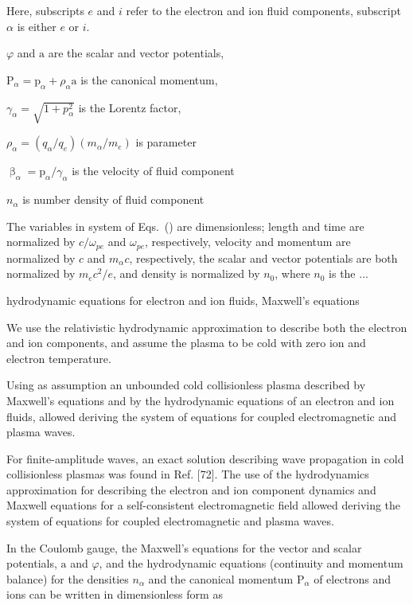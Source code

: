 \documentclass[10pt, a4paper, twoside, openright]{report}
\renewcommand{\vec}[1]{\boldsymbol{\mathrm{#1}}}
\begin{document}
Here, subscripts $ e $ and $ i $ refer to the electron and ion fluid components, subscript $ \alpha $ is either $ e $ or $ i $.

$ \varphi $ and $ \vec{a} $ are the scalar and vector potentials, 

$ \vec{P}_{\alpha} = \vec{p}_{\alpha} + \rho_{\alpha} \vec{a} $ is the canonical momentum, 

$ \gamma_{\alpha} = \sqrt{1 + p_{\alpha}^2} $ is the Lorentz factor,

$ \rho_{\alpha} = \left(q_{\alpha} / q_e \right) \left( m_{\alpha} / m_e \right) $ is parameter

$ \vec{\upbeta}_{\alpha} = \vec{p}_{\alpha} / \gamma_{\alpha} $ is the velocity of fluid component

$ n_{\alpha} $ is number density of fluid component

The variables in system of Eqs.~() are dimensionless; length and time are normalized by $ c / \omega_{pe} $ and $ \omega_{pe} $, respectively, velocity and momentum are normalized by $ c $ and $ m_{\alpha} c $, respectively, the scalar and vector potentials are both normalized by $ m_e c^2 / e $, and density is normalized by $ n_0 $, where $ n_0 $ is the ...



hydrodynamic equations for electron and ion fluids, Maxwell's equations

We use the relativistic hydrodynamic approximation to describe both the electron and ion components, and assume the plasma to be cold with zero ion and electron temperature.

Using as assumption an unbounded cold collisionless plasma described by Maxwell’s equations and by the hydrodynamic equations of an electron and ion fluids, allowed deriving the system of equations for coupled electromagnetic and plasma waves.

For finite-amplitude waves, an exact solution describing wave propagation in cold collisionless plasmas was found in Ref. [72]. The use of the hydrodynamics approximation for describing the electron and ion component dynamics and Maxwell equations for a self-consistent electromagnetic field allowed deriving the system of equations for coupled electromagnetic and plasma waves.

In the Coulomb gauge, the Maxwell’s equations for the vector and scalar potentials, $ \vec{a} $ and $ \varphi $, and the hydrodynamic equations (continuity and momentum balance) for the densities $ n_{\alpha} $ and the canonical momentum $ \vec{P}_{\alpha} $ of electrons and ions can be written in dimensionless form as
\end{document}
